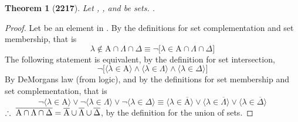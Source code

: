 \documentclass[preview]{standalone}
\newtheorem{theorem}{Theorem}
\begin{document}
\begin{theorem}[\textbf{2217}]
    Let , \bm{$\Lambda$}, and \bm{$\Delta$} be sets. 
    .
\end{theorem}
\begin{proof} \color{black}
    Let \bm{$\lambda$} be an element in 
    . 
    By the definitions for set complementation and set membership, that is
    \begin{equation*}
        \lambda \notin \mathrm{A} \cap \Lambda \cap \Delta 
            \equiv 
        \lnot \big[ \lambda \in
            \mathrm{A} \cap \Lambda \cap \Delta
        \big]
    \end{equation*}
    The following statement is equivalent, by the definition for set intersection,
    \begin{equation*}
        \lnot \Big[
            \big \langle \lambda \in \mathrm{A} \big \rangle 
                \land 
            \big \langle \lambda \in \Lambda \big \rangle
                \land 
            \big \langle \lambda \in \Delta \big \rangle
        \Big]
    \end{equation*}
    By DeMorgans law (from logic), 
    and by the definitions for set membership and set complementation, that is 
    \begin{equation*}
        \lnot \Big \langle \lambda \in \mathrm{A} \Big \rangle 
            \lor 
        \lnot \Big \langle \lambda \in \Lambda \Big \rangle 
            \lor 
        \lnot \Big \langle \lambda \in \Delta \Big \rangle
            \equiv
        \Big \langle \lambda \in \overline{\mathrm{A}} \Big \rangle 
            \lor 
        \Big \langle \lambda \in \overline{\Lambda} \Big \rangle
            \lor 
        \Big \langle \lambda \in \overline{\Delta} \Big \rangle
    \end{equation*}
    $\therefore \text{\space} \relax{
    \overline{
            \mathrm{A} 
                \cap 
            \Lambda 
                \cap 
            \Delta
    } 
        = 
    \overline{\mathrm{A}} 
        \cup 
    \overline{\Lambda} 
        \cup 
    \overline {\Delta}}
    $,
    by the definition for the union of sets.
\end{proof}
\end{document}
